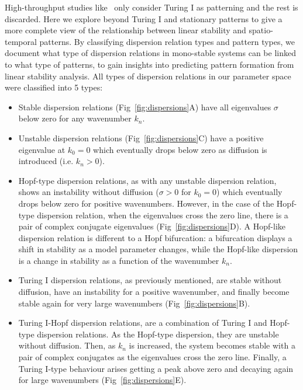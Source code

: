 High-throughput studies like~\cite{Scholes2019, Zheng2016, Marcon} only consider Turing I as patterning and the rest is discarded.
Here we explore beyond Turing I and stationary patterns to give a more complete view of the relationship between linear stability and spatio-temporal patterns.
By classifying dispersion relation types and pattern types, we document what type of dispersion relations in mono-stable systems can be linked to what type of patterns, to gain insights into predicting pattern formation from linear stability analysis.
All types of dispersion relations in our parameter space were classified into 5 types:
\begin{itemize}
    \item Stable dispersion relations (Fig~\ref{fig:dispersions}A) have all eigenvalues $\sigma$ below zero for any wavenumber $k_{n}$.
    \item Unstable dispersion relations (Fig~\ref{fig:dispersions}C) have a positive eigenvalue at $k_{0}=0$ which eventually drops below zero as diffusion is introduced (i.e. $k_{n}>0$).
    \item Hopf-type dispersion relations, as with any unstable dispersion relation, shows an instability without diffusion ($\sigma>0$ for $k_{0}=0$) which eventually drops below zero for positive wavenumbers.
    However, in the case of the Hopf-type dispersion relation, when the eigenvalues cross the zero line, there is a pair of complex conjugate eigenvalues (Fig~\ref{fig:dispersions}D).
    A Hopf-like dispersion relation is different to a Hopf bifurcation: a bifurcation displays a shift in stability as a model parameter changes, while the Hopf-like dispersion is a change in stability as a function of the wavenumber $k_{n}$.
    \item Turing I dispersion relations, as previously mentioned, are stable without diffusion, have an instability for a positive wavenumber, and finally become stable again for very large wavenumbers (Fig~\ref{fig:dispersions}B).
    \item Turing I-Hopf dispersion relations, are a combination of Turing I and Hopf-type dispersion relations.
    As the Hopf-type dispersion, they are unstable without diffusion.
    Then, as $k_{n}$ is increased, the system becomes stable with a pair of complex conjugates as the eigenvalues cross the zero line.
    Finally, a Turing I-type behaviour arises getting a peak above zero and decaying again for large wavenumbers (Fig~\ref{fig:dispersions}E).
\end{itemize}

